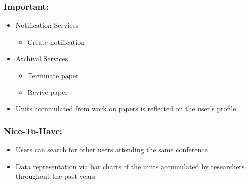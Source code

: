\documentclass[11pt]{article}
\begin{document}
	\subsubsection{Important:}
	\begin{itemize}
		\item Notification Services
		\begin{itemize}
			\item Create notification
		\end{itemize}
		\item Archival Services
		\begin{itemize}
			\item Terminate paper
			\item Revive paper
		\end{itemize}
	\end{itemize}
	\begin{itemize}
		\item Units accumulated from work on papers is reflected on the user's profile
	\end{itemize}
	
	\subsubsection{Nice-To-Have:}
	\begin{itemize}
		\item Users can search for other users attending the same conference
		\item Data representation via bar charts of the units accumulated by researchers throughout the past years
	\end{itemize}
	
\end{document}
